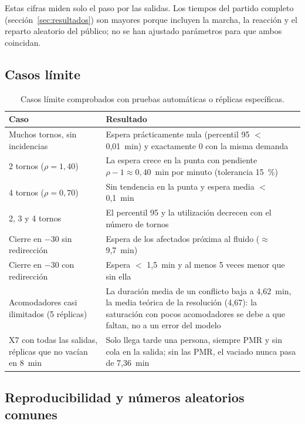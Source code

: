 Estas cifras miden solo el paso por las salidas. Los tiempos del partido completo
(sección~\ref{sec:resultados}) son mayores porque incluyen la marcha, la reacción
y el reparto aleatorio del público; no se han ajustado parámetros para que ambos
coincidan.

\subsection{Casos límite}

\begin{table}[htbp]
\centering\small
\caption{Casos límite comprobados con pruebas automáticas o réplicas específicas.}
\label{tab:limites}
\begin{tabularx}{\textwidth}{@{}p{5cm}Y@{}}
\toprule
Caso & Resultado \\
\midrule
Muchos tornos, sin incidencias & Espera prácticamente nula (percentil 95 $<$ 0,01~min) y exactamente 0 con la misma demanda \\
2 tornos ($\rho=1{,}40$) & La espera crece en la punta con pendiente $\rho-1\approx 0{,}40$~min por minuto (tolerancia 15~\%) \\
4 tornos ($\rho=0{,}70$) & Sin tendencia en la punta y espera media $<$ 0,1~min \\
2, 3 y 4 tornos & El percentil 95 y la utilización decrecen con el número de tornos \\
Cierre en $-30$ sin redirección & Espera de los afectados próxima al fluido ($\approx$ 9,7~min) \\
Cierre en $-30$ con redirección & Espera $<$ 1,5~min y al menos 5 veces menor que sin ella \\
Acomodadores casi ilimitados (5 réplicas) & La duración media de un conflicto baja a 4,62~min, la media teórica de la resolución (4,67): la saturación con pocos acomodadores se debe a que faltan, no a un error del modelo \\
X7 con todas las salidas, réplicas que no vacían en 8~min & Solo llega tarde una persona, siempre PMR y sin cola en la salida; sin las PMR, el vaciado nunca pasa de 7,36~min \\
\bottomrule
\end{tabularx}
\end{table}

\subsection{Reproducibilidad y números aleatorios comunes}\label{sec:reproducibilidad}

